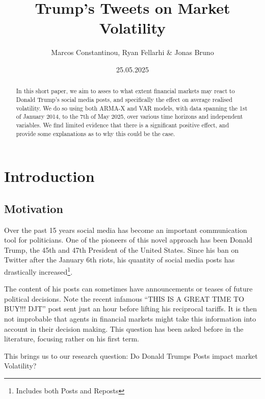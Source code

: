 \documentclass[
]{article}
\title{Trump's Tweets on Market Volatility}
\author{Marcos Constantinou, Ryan Fellarhi \& Jonas Bruno}
\date{25.05.2025}
\begin{document}
\maketitle
\begin{abstract}
In this short paper, we aim to asses to what extent financial markets may react to Donald Trump's social media posts, and specifically the effect on average realised volatility. We do so using both ARMA-X and VAR models, with data spanning the 1st of January 2014, to the 7th of May 2025, over various time horizons and independent variables. We find limited evidence that there is a significant positive effect, and provide some explanations as to why this could be the case.
\end{abstract}

{
\setcounter{tocdepth}{2}
\tableofcontents
}
\newpage

\section{Introduction}\label{introduction}

\subsection{Motivation}\label{motivation}

Over the past 15 years social media has become an important
communication tool for politicians. One of the pioneers of this novel
approach has been Donald Trump, the 45th and 47th President of the United
States. Since his ban on Twitter after the January 6th riots, his quantity of
social media posts has drastically increased\footnote{Includes both Posts and Reposts}.

The content of his posts can sometimes have announcements or teases of future
political decisions. Note the recent infamous ``THIS IS A GREAT TIME TO BUY!!! DJT''
post sent just an hour before lifting his reciprocal tariffs. It is then not
improbable that agents in financial markets might take this information into
account in their decision making. This question has been asked before in the
literature, focusing rather on his first term.

This brings us to our research question: Do Donald Trumps Posts impact market Volatility?
\end{document}
